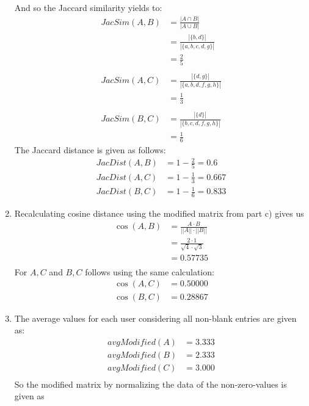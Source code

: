 \begin{enumerate}[label=(\alph*)]
    And so the Jaccard similarity yields to:
    \begin{align*}
        JacSim(A,B) &= \frac{|A \cap B|}{|A \cup B|} \\
                &= \frac{|\{b,d\}|}{|\{a,b,c,d,g\}|} \\
                &= \frac{2}{5} \\ \\
        JacSim(A,C) &= \frac{|\{d,g\}|}{|\{a,b,d,f,g,h\}|} \\
                &= \frac{1}{3} \\ \\
        JacSim(B,C) &= \frac{|\{d\}|}{|\{b,c,d,f,g,h\}|} \\
                &= \frac{1}{6}
    \end{align*}
    The Jaccard distance is given as follows:
    \begin{align*}
        JacDist(A,B) &= 1 - \frac{2}{5} = 0.6\\
        JacDist(A,C) &= 1 - \frac{1}{3} = 0.667\\
        JacDist(B,C) &= 1 - \frac{1}{6} = 0.833
    \end{align*}
    \item Recalculating cosine distance using the modified matrix from part c) gives us
    \begin{align*}
        \cos(A,B) &= \frac{A \cdot B}{||A|| \cdot ||B||} \\
                &=  \frac{2 \cdot 1}{\sqrt{4} \cdot \sqrt{3}} \\
                &= 0.57735 \\
    \end{align*}
    For $A, C$ and $B, C$ follows using the same calculation:
    \begin{align*}
        \cos(A,C) &= 0.50000 \\
        \cos(B,C) &= 0.28867
    \end{align*}
    \item The average values for each user considering all non-blank entries are given as:
    \begin{align*}
        avgModified(A) &= 3.333 \\
        avgModified(B) &= 2.333\\
        avgModified(C) &= 3.000\\
    \end{align*}
    So the modified matrix by normalizing the data of the non-zero-values is given as 


\end{enumerate}
